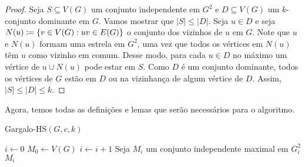 \begin{proof}
    Seja $S\subseteq V(G)$ um conjunto independente em $G^2$ e $D\subseteq V(G)$ um $k$-conjunto dominante em $G$. Vamos mostrar que $|S| \leq |D|$. Seja $u \in D$ e seja ${N(u) \coloneqq \{v \in V(G): uv \in E(G)\}}$ o conjunto dos vizinhos de $u$ em $G$. Note que $u$ e $N(u)$ formam uma estrela em $G^2$, uma vez que todos os vértices em $N(u)$ têm $u$ como vizinho em comum. Desse modo, para cada $u \in D$ no máximo um vértice de $u \cup N(u)$ pode estar em $S$. Como $D$ é um conjunto dominante, todos os vértices de $G$ estão em $D$ ou na vizinhança de algum vértice de $D$. Assim, $|S| \leq |D| \leq k$.


\end{proof}
Agora, temos todas as definições e lemas que serão necessários para o algoritmo.
\begin{algorithm}[H]
    \caption{\sc Gargalo-HS$(G,c,k)$}
    \label{k-center:bottleneck}
    \begin{algorithmic}[1]
        \State $i \leftarrow 0$
        \State $M_0 \leftarrow V(G)$
            \State $i\leftarrow i + 1$
            \State Seja $M_i$ um conjunto independente maximal em $G_i^2$
        \EndWhile
        \State \Return $M_i$
    \end{algorithmic}
\end{algorithm}


